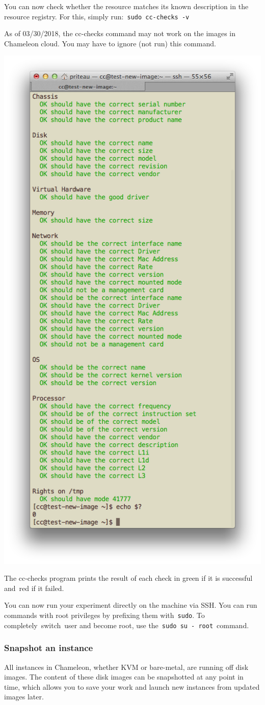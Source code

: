 You can now check whether the resource matches its known description in
the resource registry. For this, simply
run:~\texttt{sudo\ cc-checks\ -v}

\begin{WARNING}
As of 03/30/2018, the cc-checks command may not work on the images in Chameleon cloud.
You may have to ignore (not run) this command.
\end{WARNING}

{\centering \includegraphics[width=0.5\columnwidth]{images/chameleon/cc-checks.png}}

The cc-checks program prints the result of each check in green if it is
successful and~red if it failed.

You can now run your experiment directly on the machine via SSH. You can
run commands with root privileges by prefixing them with~\texttt{sudo}.
To completely~switch~user and become root, use
the~\texttt{sudo\ su\ -\ root}~command.

\subsubsection{Snapshot an instance}

All instances in Chameleon, whether KVM or bare-metal, are running off
disk images. The content of these disk images can be snapshotted at any
point in time, which allows you to save your work and launch new
instances from updated images later.

